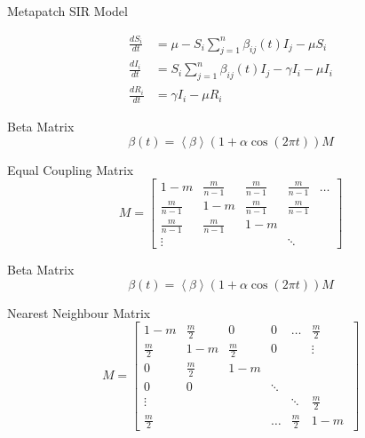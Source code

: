 \documentclass{beamer}\usepackage[]{graphicx}\usepackage[]{color}
\begin{document}
  \begin{frame}{Metapatch SIR Model}
  \begin{center}
\begin{align*}
  \frac{dS_i}{dt} &= \mu - S_i\sum\limits_{j=1}^{n}\beta_{ij}(t) I_j -\mu S_i \\ 
  \frac{dI_i}{dt} &= S_i\sum\limits_{j=1}^{n}\beta_{ij}(t) I_j -\gamma I_i - \mu I_i \\
  \frac{dR_i}{dt} &= \gamma I_i -\mu R_i
\end{align*}
\end{center}
   \end{frame}
   
   \begin{frame}{Beta Matrix}
    \begin{equation*}
  \beta(t) = \left < \beta \right > (1+\alpha \cos(2\pi t))M
\end{equation*}
\begin{alertblock}{Equal Coupling Matrix}
  \[
M =
\begin{bmatrix}
  1-m & \frac{m}{n-1} & \frac{m}{n-1} & \frac{m}{n-1} & \dots \\
  \frac{m}{n-1} & 1-m & \frac{m}{n-1} & \frac{m}{n-1}  \\
  \frac{m}{n-1} & \frac{m}{n-1} & 1-m &  \\
  \vdots &  &  & \ddots 
\end{bmatrix}
\]
\end{alertblock}
  \end{frame}
  
  \begin{frame}{Beta Matrix}
    \begin{equation*}
  \beta(t) = \left < \beta \right > (1+\alpha \cos(2\pi t))M
\end{equation*}
\begin{alertblock}{Nearest Neighbour Matrix}
  \[
M =
\begin{bmatrix}
  1-m & \frac{m}{2} & 0 & 0 & \dots & \frac{m}{2} \\
  \frac{m}{2} & 1-m & \frac{m}{2} & 0 & & \vdots \\
  0 & \frac{m}{2} & 1-m &  \\
  0 & 0 & & \ddots \\
  \vdots & & & & \ddots & \frac{m}{2} \\
  \frac{m}{2} &  & & \dots & \frac{m}{2} & 1-m \ 
\end{bmatrix}
\]
\end{alertblock}
  \end{frame}
  
\end{document}

